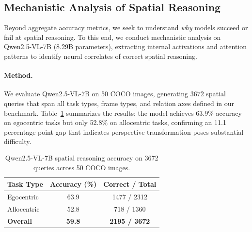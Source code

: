 %
%
%
%

\subsection{Mechanistic Analysis of Spatial Reasoning}
\label{sec:mechanistic}

Beyond aggregate accuracy metrics, we seek to understand \textit{why} models succeed or fail at spatial reasoning. To this end, we conduct mechanistic analysis on Qwen2.5-VL-7B (8.29B parameters), extracting internal activations and attention patterns to identify neural correlates of correct spatial reasoning.

\paragraph{Method.}

We evaluate Qwen2.5-VL-7B on 50 COCO images, generating \num{3672} spatial queries that span all task types, frame types, and relation axes defined in our benchmark. Table~\ref{tab:qwen_eval} summarizes the results: the model achieves 63.9\% accuracy on egocentric tasks but only 52.8\% on allocentric tasks, confirming an 11.1 percentage point gap that indicates perspective transformation poses substantial difficulty.

\begin{table}[h]
\centering
\small
\caption{Qwen2.5-VL-7B spatial reasoning accuracy on \num{3672} queries across 50 COCO images.}
\label{tab:qwen_eval}
\begin{tabular}{@{}lcc@{}}
\toprule
\textbf{Task Type} & \textbf{Accuracy (\%)} & \textbf{Correct / Total} \\
\midrule
Egocentric  & 63.9 & 1477 / 2312 \\
Allocentric & 52.8 & 718 / 1360 \\
\midrule
\textbf{Overall} & \textbf{59.8} & \textbf{2195 / 3672} \\
\bottomrule
\end{tabular}
\end{table}

